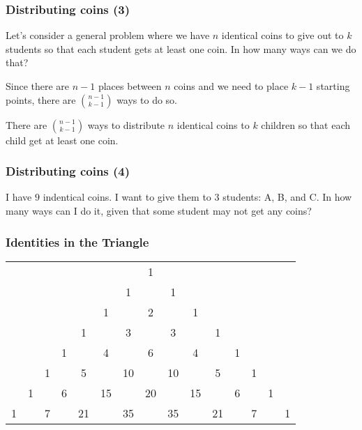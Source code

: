 \begin{frame}\frametitle{Distributing coins (3)}
  Let's consider a general problem where we have $n$ identical coins
  to give out to $k$ students so that each student gets at least one
  coin.  In how many ways can we do that?

  \pause Since there are $n-1$ places between $n$ coins and we need to
  place $k-1$ starting points, there are $\binom{n-1}{k-1}$ ways to do
  so.

  \pause
  \begin{tcolorbox}
    There are $\binom{n-1}{k-1}$ ways to distribute $n$ identical
    coins to $k$ children so that each child get at least one coin.
  \end{tcolorbox}
\end{frame}

\begin{frame}\frametitle{Distributing coins (4)}
  \begin{tcolorbox}
    I have $9$ indentical coins.  I want to give them to $3$ students:
    A, B, and C.  In how many ways can I do it, given that some
    student may not get any coins?
  \end{tcolorbox}
  
  \vspace{1.5in}
\end{frame}

\begin{frame}\frametitle{Identities in the Triangle}
  \begin{tcolorbox}
    {\footnotesize
      \begin{tabular}{ccccccccccccccc}
        & & & & & & & 1 & & & & & & & \\
        & & & & & & 1 & & 1 & & & & & & \\
        & & & & & 1 & & 2 & & 1 & & & & & \\
        & & & & 1 & & 3 & & 3 & & 1 & & & & \\
        & & & 1 & & 4 & & 6 & & 4 & & 1 & & & \\
        & & 1 & & 5 & & 10 & & 10 & & 5 & & 1 & & \\
        & 1 & & 6 & & 15 & & 20 & & 15 & & 6 & & 1 & \\
        1 & & 7 & & 21 & & 35 & & 35 & & 21 & & 7 & & 1 \\
      \end{tabular}
    }
    \vspace{0.2in}
  \end{tcolorbox}
\end{frame}


